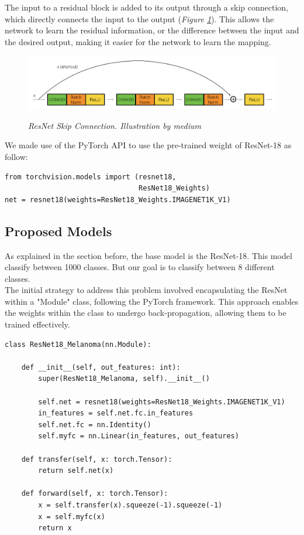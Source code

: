 The input to a residual block is added to its output through a skip connection,
which directly connects the input to the output (\textit{Figure
\ref{fig:skip-connection}}). This allows the network to learn the residual
information, or the difference between the input and the desired output, making
it easier for the network to learn the mapping.

\begin{figure}[H]
  \centering
  \includegraphics[width=\textwidth]{imatges/methodological_contribution/skip-connections.png}
  \caption[ResNet Skip Connection]{\textit{ResNet Skip Connection. Illustration by medium}}
  {\label{fig:skip-connection}}
\end{figure}

We made use of the PyTorch API to use the pre-trained weight of ResNet-18 as follow:

\begin{Verbatim}[fontsize=\scriptsize]
from torchvision.models import (resnet18,
                                ResNet18_Weights)
net = resnet18(weights=ResNet18_Weights.IMAGENET1K_V1)
\end{Verbatim}

\subsection{Proposed Models}

As explained in the section before, the base model is the ResNet-18. This
model classify between 1000 classes. But our goal is to classify between 8
different classes. \\

The initial strategy to address this problem involved encapsulating the ResNet
within a "Module" class, following the PyTorch framework. This approach enables
the weights within the class to undergo back-propagation, allowing them to be
trained effectively.

\begin{Verbatim}[fontsize=\scriptsize]
class ResNet18_Melanoma(nn.Module):

    def __init__(self, out_features: int):
        super(ResNet18_Melanoma, self).__init__()

        self.net = resnet18(weights=ResNet18_Weights.IMAGENET1K_V1)
        in_features = self.net.fc.in_features
        self.net.fc = nn.Identity()
        self.myfc = nn.Linear(in_features, out_features)

    def transfer(self, x: torch.Tensor):
        return self.net(x)

    def forward(self, x: torch.Tensor):
        x = self.transfer(x).squeeze(-1).squeeze(-1)
        x = self.myfc(x)
        return x
\end{Verbatim}

